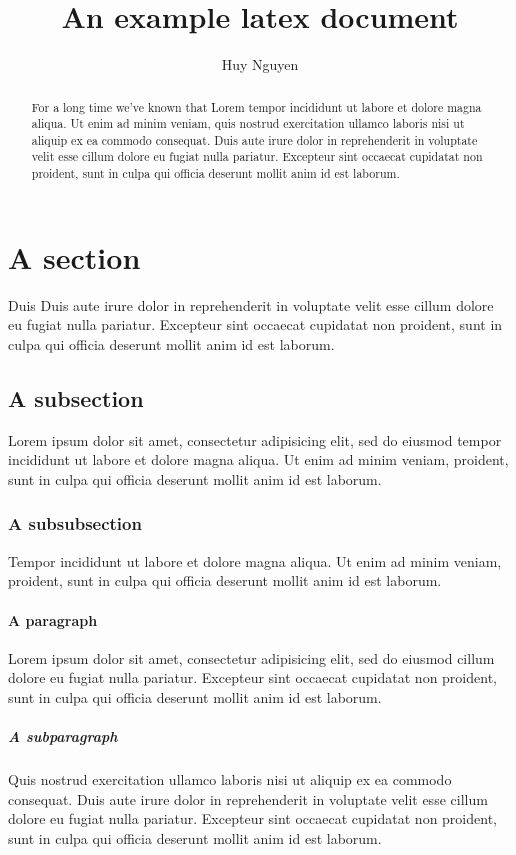 \documentclass[10pt]{article}
\title{An example latex document}
\author{Huy Nguyen}
\begin{document}
\maketitle

\tableofcontents


\begin{abstract}
For a long time we've known that Lorem 
tempor incididunt ut labore et dolore magna aliqua. Ut enim ad minim veniam,
quis nostrud exercitation ullamco laboris nisi ut aliquip ex ea commodo
consequat. Duis aute irure dolor in reprehenderit in voluptate velit esse
cillum dolore eu fugiat nulla pariatur. Excepteur sint occaecat cupidatat non
proident, sunt in culpa qui officia deserunt mollit anim id est laborum.
\end{abstract}

\section{A section}
Duis Duis aute irure dolor in reprehenderit in voluptate velit esse
cillum dolore eu fugiat nulla pariatur. Excepteur sint occaecat cupidatat non
proident, sunt in culpa qui officia deserunt mollit anim id est laborum.

\subsection{A subsection}
Lorem ipsum dolor sit amet, consectetur adipisicing elit, sed do eiusmod
tempor incididunt ut labore et dolore magna aliqua. Ut enim ad minim veniam,
proident, sunt in culpa qui officia deserunt mollit anim id est laborum.

\subsubsection{A subsubsection}
Tempor incididunt ut labore et dolore magna aliqua. Ut enim ad minim veniam,
proident, sunt in culpa qui officia deserunt mollit anim id est laborum.

\paragraph{A paragraph}
Lorem ipsum dolor sit amet, consectetur adipisicing elit, sed do eiusmod
cillum dolore eu fugiat nulla pariatur. Excepteur sint occaecat cupidatat non
proident, sunt in culpa qui officia deserunt mollit anim id est laborum.

\subparagraph{A subparagraph}
Quis nostrud exercitation ullamco laboris nisi ut aliquip ex ea commodo
consequat. Duis aute irure dolor in reprehenderit in voluptate velit esse
cillum dolore eu fugiat nulla pariatur. Excepteur sint occaecat cupidatat non
proident, sunt in culpa qui officia deserunt mollit anim id est laborum.
\end{document}
